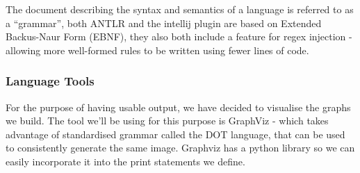 The document describing the syntax and semantics of a language is referred to as a ``grammar''\cite{Grammars}, both
ANTLR and the intellij plugin are based on Extended Backus-Naur Form (EBNF), they also both include a feature for
regex injection - allowing more well-formed rules to be written using fewer lines of code.

\subsubsection{Language Tools}
For the purpose of having usable output, we have decided to visualise the graphs we build.
The tool we'll be using for this purpose is GraphViz\cite{GraphViz} - which takes advantage of standardised grammar
called the DOT language, that can be used to consistently generate the same image.
Graphviz has a python library so we can easily incorporate it into the print statements we define.